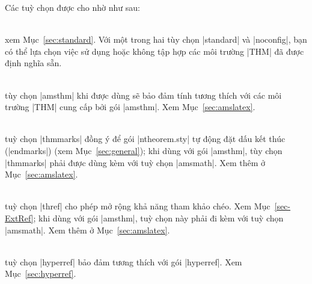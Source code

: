\documentclass[11pt,oneside]{ltxdoc}
\theoremstyle{marginbreak}
\theoremstyle{changebreak}
\theoremstyle{change}
\theoremstyle{plain}
\theoremstyle{nonumberplain}
\begin{document}
\medskip
Các tuỳ chọn được cho nhờ  như sau: %
\begin{description}
\item{} \\
	xem Mục~\vref{sec:standard}. Với một
	trong hai tùy chọn |standard| và |noconfig|,
	bạn có thể lựa chọn việc sử dụng hoặc không tập hợp
	các môi trường |THM| đã được định nghĩa sẵn.
\item{}\\
	tùy chọn |amsthm| khi được dùng sẽ bảo đảm tính tương thích với các môi trường
	|THM| cung cấp bởi gói |amsthm|. Xem Mục~\vref{sec:amslatex}.
\item{}\\
	tuỳ chọn |thmmarks| đồng ý để gói |ntheorem.sty| tự động đặt dấu kết thúc
	(|endmarks|) (xem Mục~\ref{sec:general}); khi dùng với gói |amsthm|,
	tùy chọn |thmmarks| phải được dùng kèm với tuỳ chọn |amsmath|.
	Xem thêm ở Mục~\ref{sec:amslatex}.
\item{}\\
	tuỳ chọn |thref| cho phép mở rộng khả năng tham khảo chéo. Xem Mục~\vref{sec-ExtRef};
	khi dùng với gói |amsthm|, tuỳ chọn này phải đi kèm với tuỳ chọn |amsmath|.
	Xem thêm ở Mục~\ref{sec:amslatex}.
\item{}\\
	tuỳ chọn |hyperref| bảo đảm tương thích với gói |hyperref|.
	Xem Mục~\vref{sec:hyperref}.
\end{description}
\end{document}
